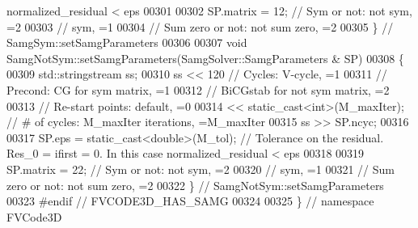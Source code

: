 \begin{DoxyCode}
{       normalized\_residual < eps}
00301 
00302     SP.matrix = 12;     \textcolor{comment}{// Sym or not: not sym, =2}
00303                         \textcolor{comment}{//             sym, =1}
00304                         \textcolor{comment}{// Sum zero or not: not sum zero, =2}
00305 \} \textcolor{comment}{// SamgSym::setSamgParameters}
00306 
00307 \textcolor{keywordtype}{void} SamgNotSym::setSamgParameters(SamgSolver::SamgParameters & SP)
00308 \{
00309     std::stringstream ss;
00310     ss << 120           \textcolor{comment}{// Cycles: V-cycle, =1}
00311                         \textcolor{comment}{// Precond: CG for sym matrix, =1}
00312                         \textcolor{comment}{//          BiCGstab for not sym matrix, =2}
00313                         \textcolor{comment}{// Re-start points: default, =0}
00314        << \textcolor{keyword}{static\_cast<}\textcolor{keywordtype}{int}\textcolor{keyword}{>}(M\_maxIter);  \textcolor{comment}{// # of cycles: M\_maxIter iterations, =M\_maxIter}
00315     ss >> SP.ncyc;
00316 
00317     SP.eps = \textcolor{keyword}{static\_cast<}\textcolor{keywordtype}{double}\textcolor{keyword}{>}(M\_tol); \textcolor{comment}{// Tolerance on the residual. Res\_0 = ifirst = 0. In this case
       normalized\_residual < eps}
00318 
00319     SP.matrix = 22;     \textcolor{comment}{// Sym or not: not sym, =2}
00320                         \textcolor{comment}{//             sym, =1}
00321                         \textcolor{comment}{// Sum zero or not: not sum zero, =2}
00322 \} \textcolor{comment}{// SamgNotSym::setSamgParameters}
00323 \textcolor{preprocessor}{#endif // FVCODE3D\_HAS\_SAMG}
00324 
00325 \} \textcolor{comment}{// namespace FVCode3D}
\end{DoxyCode}
